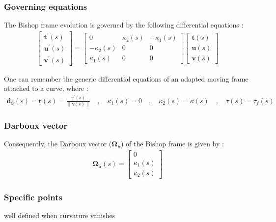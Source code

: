 \subsubsection{Governing equations}
The Bishop frame evolution is governed by the following differential equations :
\begin{gather}
\left[\begin{array}{c}
\mathbf{t^{'}}(s) \\
\mathbf{u^{'}}(s) \\
\mathbf{v^{'}}(s)
\end{array}\right]
=
\left[\begin{array}{ccc}
0 & \kappa_{2}(s) & -\kappa_{1}(s) \\
-\kappa_{2}(s) & 0 & 0 \\
\kappa_{1}(s) & 0 & 0
\end{array}\right]
\left[\begin{array}{c}
\mathbf{t}(s) \\
\mathbf{u}(s) \\
\mathbf{v}(s)
\end{array}\right]
\end{gather}

One can remember the generic differential equations of an adapted moving frame attached to a curve, where : 
\begin{gather}
\mathbf{d_{3}}(s) = \mathbf{t}(s) = \frac{\gamma^{'}(s)}{\|\gamma(s)\|}
\quad,\quad
\kappa_{1}(s) = 0
\quad,\quad
\kappa_{2}(s) = \kappa(s)
\quad,\quad
\tau(s) = \tau_{f}(s)
\end{gather}

\subsubsection{Darboux vector}
Consequently, the Darboux vector ($\mathbf{\Omega_{b}}$) of the Bishop frame is given by :
\begin{gather}
\mathbf{\Omega_b}(s) 
= 
\left[\begin{array}{c}
0\\
\kappa_1(s)\\
\kappa_2(s)
\end{array}\right]
\end{gather}

\subsubsection{Specific points}
well defined when curvature vanishes

